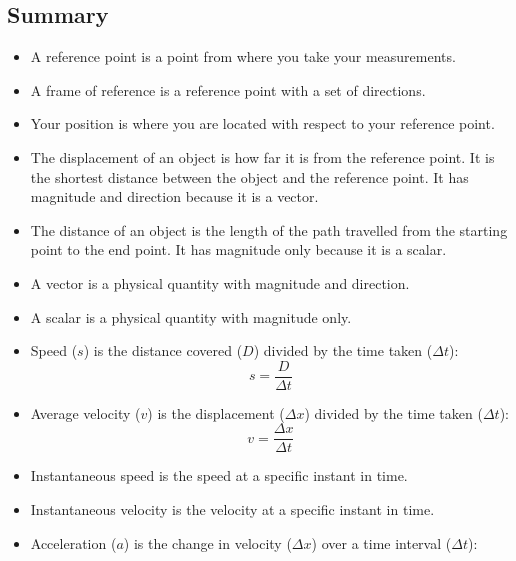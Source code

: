     \noindent
    \label{m38796*cid12}
            \subsection{ Summary}
            \nopagebreak
      \label{m38796*id80622}\begin{itemize}[noitemsep]
            \label{m38796*uid154}\item A reference point is a point from where you take your measurements.
\label{m38796*uid155}\item A frame of reference is a reference point with a set of directions.
\label{m38796*uid156}\item Your position is where you are located with respect to your reference point.
\label{m38796*uid157}\item The displacement of an object is how far it is from the reference point. It is the shortest distance between the object and the reference point. It has magnitude and direction because it is a vector.
\label{m38796*uid158}\item The distance of an object is the length of the path travelled from the starting point to the end point. It has magnitude only because it is a scalar.
\label{m38796*uid159}\item A vector is a physical quantity with magnitude and direction.
\label{m38796*uid160}\item A scalar is a physical quantity with magnitude only.
\label{m38796*uid161}\item Speed ($s$) is the distance covered ($D$) divided by the time taken ($\Delta t$):
\label{m38796*id80758}\nopagebreak\noindent{}
    \begin{equation}
    s=\frac{D}{\Delta t}\tag{20.72}
      \end{equation}
    \label{m38796*uid162}\item Average velocity ($v$) is the displacement ($\Delta x$) divided by the time taken ($\Delta t$):
\label{m38796*id80827}\nopagebreak\noindent{}
    \begin{equation}
    v=\frac{\Delta x}{\Delta t}\tag{20.73}
      \end{equation}
    \label{m38796*uid163}\item Instantaneous speed is the speed at a specific instant in time.
\label{m38796*uid164}\item Instantaneous velocity is the velocity at a specific instant in time.
\label{m38796*uid165}\item Acceleration ($a$) is the change in velocity ($\Delta x$) over a time interval ($\Delta t$):

\end{itemize}
